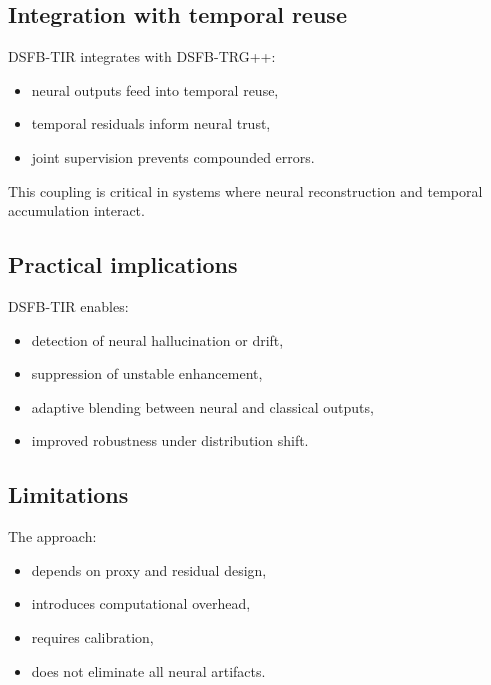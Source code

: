 \documentclass[11pt]{article}
\theoremstyle{definition}
\theoremstyle{plain}
\begin{document}

\subsection{Integration with temporal reuse}

DSFB-TIR integrates with DSFB-TRG++:
\begin{itemize}[leftmargin=1.5em]
    \item neural outputs feed into temporal reuse,
    \item temporal residuals inform neural trust,
    \item joint supervision prevents compounded errors.
\end{itemize}

This coupling is critical in systems where neural reconstruction and temporal accumulation interact.


\subsection{Practical implications}

DSFB-TIR enables:
\begin{itemize}[leftmargin=1.5em]
    \item detection of neural hallucination or drift,
    \item suppression of unstable enhancement,
    \item adaptive blending between neural and classical outputs,
    \item improved robustness under distribution shift.
\end{itemize}


\subsection{Limitations}

The approach:
\begin{itemize}[leftmargin=1.5em]
    \item depends on proxy and residual design,
    \item introduces computational overhead,
    \item requires calibration,
    \item does not eliminate all neural artifacts.
\end{itemize}
\end{document}
